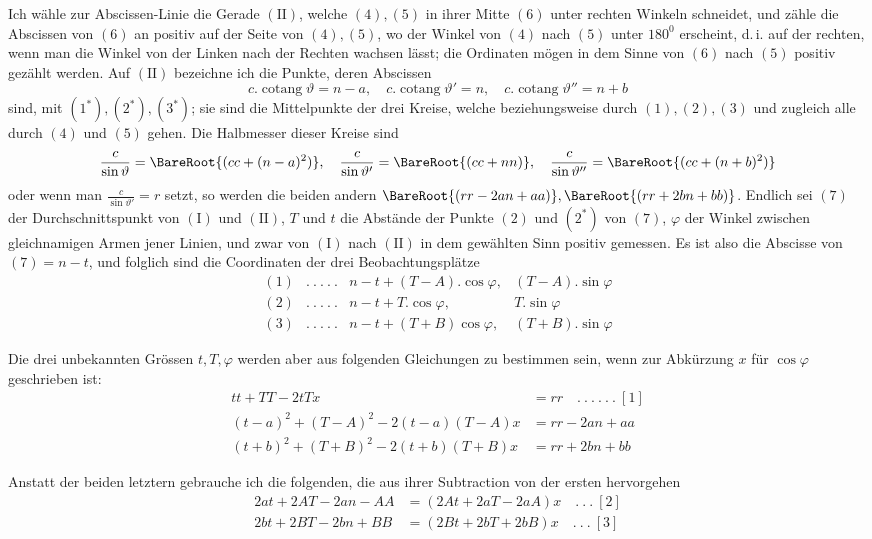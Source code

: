%
\par
Ich wähle zur Abscissen-Linie die Gerade \(\mathrm{(II)}\), welche \((4),(5)\) in ihrer Mitte \((6)\) unter rechten Winkeln schneidet, und zähle die Abscissen von \((6)\) an positiv auf der Seite von \((4),(5)\), wo der Winkel von \((4)\) nach \((5)\) unter \(180^0\) erscheint, d.\,i. auf der rechten, wenn man die Winkel von der Linken nach der Rechten wachsen lässt; die Ordinaten mögen in dem Sinne von \((6)\) nach \((5)\) positiv gezählt werden. Auf \(\mathrm{(II)}\) bezeichne ich die Punkte, deren Abscissen
\[c.\operatorname{cotang}\vartheta=n-a,\quad c.\operatorname{cotang}\vartheta'=n,\quad c.\operatorname{cotang}\vartheta''=n+b\]
sind, mit \((1^*),(2^*),(3^*)\); sie sind die Mittelpunkte der drei Kreise, welche beziehungsweise durch \((1),(2),(3)\) und zugleich alle durch \((4)\) und \((5)\) gehen. Die Halbmesser dieser Kreise sind
\[\frac c{\sin\vartheta}=\BareRoot{(cc+(n-a)^2)},\quad\frac c{\sin\vartheta'}=\BareRoot{(cc+nn)},\quad\frac c{\sin\vartheta''}=\BareRoot{(cc+(n+b)^2)}\]
oder wenn man \(\frac c{\sin\vartheta'}=r\) setzt, so werden die beiden andern \(\BareRoot{(rr-2an+aa)},\BareRoot{(rr+2bn+bb)}\). Endlich sei \((7)\) der Durchschnittspunkt von \(\mathrm{(I)}\) und \(\mathrm{(II)}\), \(T\) und \(t\) die Abstände der Punkte \((2)\) und \((2^*)\) von \((7)\), \(\varphi\) der Winkel zwischen gleichnamigen Armen jener Linien, und zwar von \(\mathrm{(I)}\) nach \(\mathrm{(II)}\) in dem gewählten Sinn positiv gemessen. Es ist also die Abscisse von \((7)=n-t\), und folglich sind die Coordinaten der drei Beobachtungsplätze
\[\begin{array}{rcll}(1)&.\ .\ .\ .\ .&n-t+(T-A).\cos\varphi,&(T-A).\sin\varphi\\
(2)&.\ .\ .\ .\ .&n-t+T.\cos\varphi,&T.\sin\varphi\\
(3)&.\ .\ .\ .\ .&n-t+(T+B)\cos\varphi,&(T+B).\sin\varphi\end{array}\]
\par
Die drei unbekannten Grössen \(t,T,\varphi\) werden aber aus folgenden Gleichungen zu bestimmen sein, wenn zur Abkürzung \(x\) für \(\cos\varphi\) geschrieben ist:
\[\begin{aligned}tt+TT-2tTx&=rr\quad.\ .\ .\ .\ .\ .\ [1]\\
(t-a)^2+(T-A)^2-2(t-a)(T-A)x&=rr-2an+aa\\
(t+b)^2+(T+B)^2-2(t+b)(T+B)x&=rr+2bn+bb\end{aligned}\]
\par
Anstatt der beiden letztern gebrauche ich die folgenden, die aus ihrer Subtraction von der ersten hervorgehen
\[\begin{aligned}2at+2AT-2an-AA&=(2At+2aT-2aA)x\quad.\ .\ .\ [2]\\
2bt+2BT-2bn+BB&=(2Bt+2bT+2bB)x\quad.\ .\ .\ [3]\end{aligned}\]
